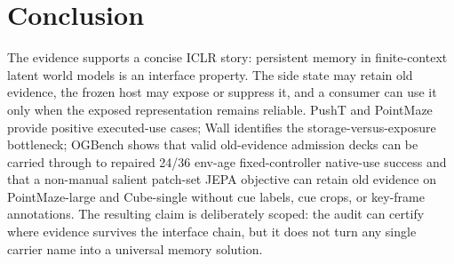 \section{Conclusion}

The evidence supports a concise ICLR story: persistent memory in
finite-context latent world models is an interface property.  The side state
may retain old evidence, the frozen host may expose or suppress it, and a
consumer can use it only when the exposed representation remains reliable.
PushT and PointMaze provide positive executed-use cases; Wall identifies the
storage-versus-exposure bottleneck; OGBench shows that valid old-evidence
admission decks can be carried through to repaired 24/36 env-age
fixed-controller native-use success and that a non-manual salient patch-set
JEPA objective can retain old evidence on PointMaze-large and Cube-single
without cue labels, cue crops, or key-frame annotations.  The
resulting claim is deliberately scoped: the audit can certify where evidence
survives the interface chain, but it does not turn any single carrier name into
a universal memory solution.
